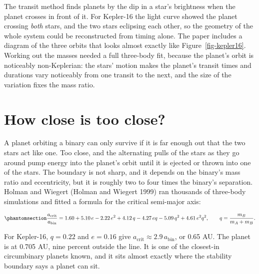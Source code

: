 \documentclass[
  10.5pt,
  letterpaper,
]{scrbook}
\theoremstyle{plain}
\theoremstyle{remark}
\begin{document}
\begin{tcolorbox}[enhanced jigsaw, arc=.35mm, bottomrule=.15mm, bottomtitle=1mm, breakable, colback=white, colbacktitle=quarto-callout-note-color!10!white, colframe=quarto-callout-note-color-frame, coltitle=black, left=2mm, leftrule=.75mm, opacityback=0, opacitybacktitle=0.6, rightrule=.15mm, title={Where it comes from}, titlerule=0mm, toprule=.15mm, toptitle=1mm]

The transit method finds planets by the dip in a star's brightness when
the planet crosses in front of it. For Kepler-16 the light curve showed
the planet crossing \emph{both} stars, and the two stars eclipsing each
other, so the geometry of the whole system could be reconstructed from
timing alone. The paper includes a diagram of the three orbits that
looks almost exactly like Figure~\ref{fig-kepler16}. Working out the
masses needed a full three-body fit, because the planet's orbit is
noticeably non-Keplerian: the stars' motion makes the planet's transit
times and durations vary noticeably from one transit to the next, and
the size of the variation fixes the mass ratio.

\end{tcolorbox}

\section{How close is too close?}\label{how-close-is-too-close}

A planet orbiting a binary can only survive if it is far enough out that
the two stars act like one. Too close, and the alternating pulls of the
stars as they go around pump energy into the planet's orbit until it is
ejected or thrown into one of the stars. The boundary is not sharp, and
it depends on the binary's mass ratio and eccentricity, but it is
roughly two to four times the binary's separation. Holman and Wiegert
(Holman and Wiegert 1999) ran thousands of three-body simulations and
fitted a formula for the critical semi-major axis:

\begin{equation}\protect\phantomsection\label{eq-holman-wiegert}{
\frac{a_{\mathrm{crit}}}{a_{\mathrm{bin}}} = 1.60 + 5.10\,e - 2.22\,e^2 + 4.12\,q - 4.27\,e q - 5.09\,q^2 + 4.61\,e^2 q^2,
\qquad q = \frac{m_B}{m_A + m_B}.
}\end{equation}

For Kepler-16, \(q = 0.22\) and \(e = 0.16\) give
\(a_{\mathrm{crit}} \approx 2.9\,a_{\mathrm{bin}}\), or 0.65 AU. The
planet is at 0.705 AU, nine percent outside the line. It is one of the
closest-in circumbinary planets known, and it sits almost exactly where
the stability boundary says a planet can sit.
\end{document}
